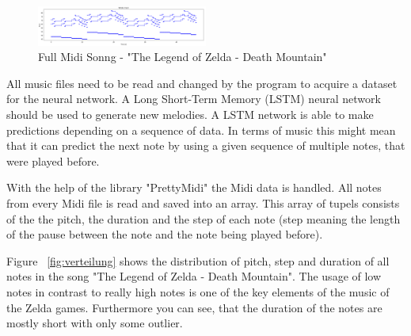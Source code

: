 \begin{figure}
\centering
\includegraphics[width=0.5\textwidth]{./pics/fullSong.PNG}
\caption{Full Midi Sonng - "The Legend of Zelda - Death Mountain"}
\label{fig:fullSong}    
\end{figure}

All music files need to be read and changed by the program to acquire
a dataset for the neural network. A Long Short-Term Memory (LSTM) neural
network should be used to generate new melodies. A LSTM network is able to 
make predictions depending on a sequence of data. In terms of music this 
might mean that it can predict the next note by using a given sequence of 
multiple notes, that were played before.

With the help of the library "PrettyMidi" the Midi data is handled. All notes
from every Midi file is read and saved into an array. This array of tupels 
consists of the the pitch, the duration and the step of each note (step meaning
the length of the pause between the note and the note being played before).

Figure ~\ref{fig:verteilung} shows the distribution of pitch, step and duration
of all notes in the song "The Legend of Zelda - Death Mountain". The usage of 
low notes in contrast to really high notes is one of the key elements of 
the music of the Zelda games. Furthermore you can see, that the duration of
the notes are mostly short with only some outlier. 

